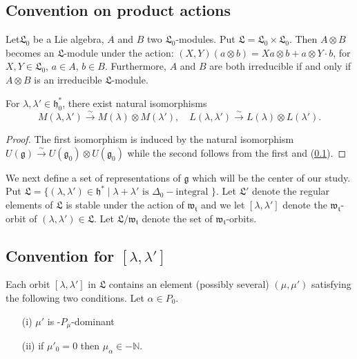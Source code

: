\subsection{Convention on product actions}\label{chap6:subsec6.3}
Let\pageoriginale $\mathfrak{L}_0$ be a Lie algebra, $A$ and $B$ two
$\mathfrak{L}_0$-modules. Put $\mathfrak{L} = \mathfrak{L}_0 \times
\mathfrak{L}_0$. Then $A \otimes B$ becomes an $\mathfrak{L}$-module
under the action: $(X,Y) (a \otimes b) = X a \otimes b + a \otimes Y
\cdot b$, for $X, Y \in \mathfrak{L}_0$, $a \in A$, $b \in
B$. Furthermore, $A$ and $B$ are both irreducible if and only if $A
\otimes B$ is an irreducible $\mathfrak{L}$-module.

\setcounter{prop}{3}
\begin{lemma}\label{chap6:lem6.4}
For $\lambda, \lambda' \in \mathfrak{h}^*_0$, there exist natural
isomorphisms
$$
M(\lambda, \lambda') \xrightarrow{\sim} M(\lambda) \otimes
M(\lambda'), \quad L(\lambda, \lambda') \xrightarrow{\sim} L(\lambda)
\otimes L(\lambda').
$$
\end{lemma}

\begin{proof}
The first isomorphism is induced by the natural isomorphism
$U(\mathfrak{g}) \xrightarrow{\sim} U(\mathfrak{g}_0) \otimes
U(\mathfrak{g}_0)$  while the second follows from the first and
(\ref{chap6:subsec6.3}). 
\end{proof}

We next define a set of representations of $\mathfrak{g}$ which will
be the center of our study. Put $\mathfrak{L} =\{(\lambda, \lambda')
\in \mathfrak{h}^* \mid \lambda + \lambda' \text{ is }
\Delta_0-\text{integral }\}$. Let $\mathfrak{L}'$ denote the regular
elements of $\mathfrak{L}$  is stable under the action of
$\mathfrak{w}_\mathfrak{t}$ and we let $[\lambda, \lambda']$ denote
the $\mathfrak{w}_\mathfrak{t}$-orbit of $(\lambda, \lambda') \in
\mathfrak{L}$. Let $\mathfrak{L}/\mathfrak{w}_\mathfrak{t}$  denote
the set of $\mathfrak{w}_\mathfrak{t}$-orbits. 

\setcounter{subsection}{4}
\subsection{Convention for $[\lambda,
    \lambda']$}\label{chap6:subsec6.5}
Each orbit $[\lambda, \lambda']$ in $\mathfrak{L}$ contains an element
(possibly several) $(\mu, \mu')$ satisfying the following two
conditions. Let $\alpha \in P_0$.
\begin{itemize}
\item[{\rm (i)}] $\mu'$ is -$P_\mu$-dominant

\item[{\rm (ii)}] if $\mu'_0 = 0$ then $\mu_\alpha \in - \mathbb{N}$.
\end{itemize}

